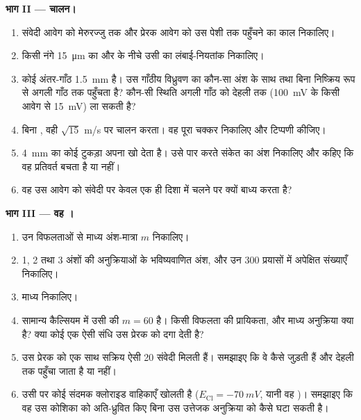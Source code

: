 \begin{problem}
\medskip
\noindent\textbf{भाग II --- चालन।}
\begin{enumerate}[resume]
  \item संवेदी आवेग को मेरुरज्जु तक और प्रेरक आवेग को उस पेशी तक
        पहुँचने का काल निकालिए।
  \item किसी नंगे \qty{15}{\micro m}  का और  के नीचे उसी
         का लंबाई-नियतांक निकालिए।
  \item कोई अंतर-गाँठ \qty{1.5}{mm} है। उस गाँठीय विध्रुवण का कौन-सा
        अंश  के साथ तथा बिना निष्क्रिय रूप से अगली गाँठ तक
        पहुँचता है? कौन-सी स्थिति अगली गाँठ को देहली तक
        (\qty{100}{mV} के किसी आवेग से \qty{15}{mV}) ला सकती है?
  \item बिना , वही  $\sqrt{15}$
        m/s पर चालन करता। वह पूरा चक्कर निकालिए और टिप्पणी कीजिए।
  \item \qty{4}{mm} का कोई टुकड़ा अपना  खो देता है। उसे पार करते
        संकेत का अंश निकालिए और कहिए कि वह प्रतिवर्त
        बचता है या नहीं।
  \item वह  उस आवेग को संवेदी  पर केवल एक ही
        दिशा में चलने पर क्यों बाध्य करता है?
\end{enumerate}

\medskip
\noindent\textbf{भाग III --- वह ।}
\begin{enumerate}[resume]
  \item उन विफलताओं से माध्य अंश-मात्रा $m$ निकालिए।
  \item 1, 2 तथा 3 अंशों की अनुक्रियाओं के भविष्यवाणित अंश, और उन 300
        प्रयासों में अपेक्षित संख्याएँ निकालिए।
  \item माध्य  निकालिए।
  \item सामान्य कैल्सियम में उसी  की $m = 60$ है। किसी
        विफलता की प्रायिकता, और माध्य अनुक्रिया क्या है? क्या कोई एक
        ऐसी संधि उस प्रेरक  को दगा देती है?
  \item उस प्रेरक  को एक साथ सक्रिय ऐसी \num{20} संवेदी 
        मिलती हैं। समझाइए कि वे कैसे जुड़ती हैं और देहली तक
        पहुँचा जाता है या नहीं।
  \item उसी  पर कोई संदमक  क्लोराइड
        वाहिकाएँ खोलती है ($E_{\mathrm{Cl}} = \qty{-70}{mV}$, यानी वह )। समझाइए कि वह उस कोशिका को अति-ध्रुवित किए बिना उस उत्तेजक
        अनुक्रिया को कैसे घटा सकती है।
\end{enumerate}


\end{problem}
